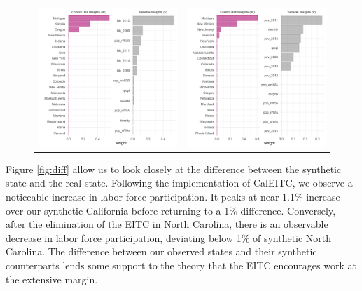 \documentclass{article}
\begin{document}
\begin{figure}
\begin{center}
\begin{tabular}{cc}
 \includegraphics[width=80mm]{nc_lab_weights} &   \includegraphics[width=80mm]{nc_pov_weights} \\
\end{tabular}
\end{center}
\end{figure}

\restoregeometry

Figure \ref{fig:diff} allow us to look closely at the difference between the synthetic state and the real state. Following the implementation of CalEITC, we observe a noticeable increase in labor force participation. It peaks at near 1.1\% increase over our synthetic California before returning to a 1\% difference. Conversely, after the elimination of the EITC in North Carolina, there is an observable decrease in labor force participation, deviating below 1\% of synthetic North Carolina. The difference between our observed states and their synthetic counterparts lends some support to the theory that the EITC encourages work at the extensive margin. 
\end{document}
